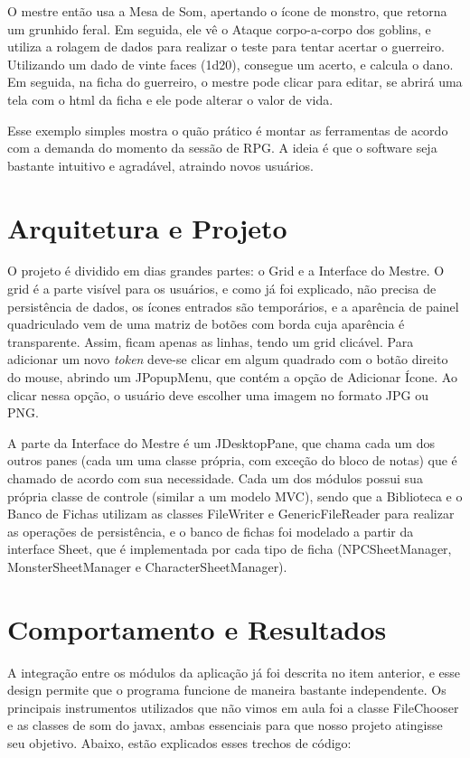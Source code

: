 \documentclass[
	article,			%
	11pt,				%
	oneside,			%
	a4paper,			%
	english,			%
	brazil,				%
	sumario=tradicional
	]{abntex2}
\begin{document}
    O mestre então usa a Mesa de Som, apertando o ícone de monstro, que retorna um grunhido feral. Em seguida, ele vê o Ataque corpo-a-corpo dos goblins, e utiliza a rolagem de dados para realizar o teste para tentar acertar o guerreiro. Utilizando um dado de vinte faces (1d20), consegue um acerto, e calcula o dano. Em seguida, na ficha do guerreiro, o mestre pode clicar para editar, se abrirá uma tela com o html da ficha e ele pode alterar o valor de vida.
    
    Esse exemplo simples mostra o quão prático é montar as ferramentas de acordo com a demanda do momento da sessão de RPG. A ideia é que o software seja bastante intuitivo e agradável, atraindo novos usuários.
    
\section{Arquitetura e Projeto}

	O projeto é dividido em dias grandes partes: o Grid e a Interface do Mestre. O grid é a parte visível para os usuários, e como já foi explicado, não precisa de persistência de dados, os ícones entrados são temporários, e a aparência de painel quadriculado vem de uma matriz de botões com borda cuja aparência é transparente. Assim, ficam apenas as linhas, tendo um grid clicável. Para adicionar um novo \textit{token} deve-se clicar em algum quadrado com o botão direito do mouse, abrindo um JPopupMenu, que contém a opção de Adicionar Ícone. Ao clicar nessa opção, o usuário deve escolher uma imagem no formato JPG ou PNG.
    
    A parte da Interface do Mestre é um JDesktopPane, que chama cada um dos outros panes (cada um uma classe própria, com exceção do bloco de notas) que é chamado de acordo com sua necessidade. Cada um dos módulos possui sua própria classe de controle (similar a um modelo MVC), sendo que a Biblioteca e o Banco de Fichas utilizam as classes FileWriter e GenericFileReader para realizar as operações de persistência, e o banco de fichas foi modelado a partir da interface Sheet, que é implementada por cada tipo de ficha (NPCSheetManager, MonsterSheetManager e CharacterSheetManager).
    
\section{Comportamento e Resultados}

	A integração entre os módulos da aplicação já foi descrita no item anterior, e esse design permite que o programa funcione de maneira bastante independente. Os principais instrumentos utilizados que não vimos em aula foi a classe FileChooser e as classes de som do javax, ambas essenciais para que nosso projeto atingisse seu objetivo. Abaixo, estão explicados esses trechos de código:
	
\end{document}
